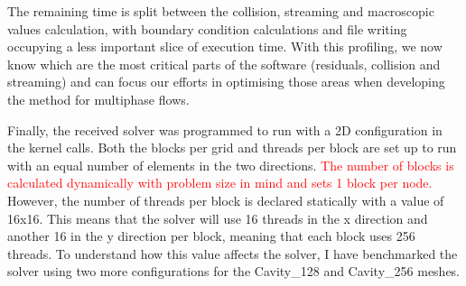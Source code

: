 \documentclass[12pt]{book}
\begin{document}
\par The remaining time is split between the collision, streaming and macroscopic values calculation, with boundary condition calculations and file writing occupying a less important slice of execution time. With this profiling, we now know which are the most critical parts of the software (residuals, collision and streaming) and can focus our efforts in optimising those areas when developing the method for multiphase flows.
\par Finally, the received solver was programmed to run with a 2D configuration in the kernel calls. Both the blocks per grid and threads per block are set up to run with an equal number of elements in the two directions. \textcolor{red}{The number of blocks is calculated dynamically with problem size in mind and sets 1 block per node.} However, the number of threads per block is declared statically with a value of 16x16. This means that the solver will use 16 threads in the x direction and another 16 in the y direction per block, meaning that each block uses 256 threads. To understand how this value affects the solver, I have benchmarked the solver using two more configurations for the Cavity\_128 and Cavity\_256 meshes.
\end{document}
